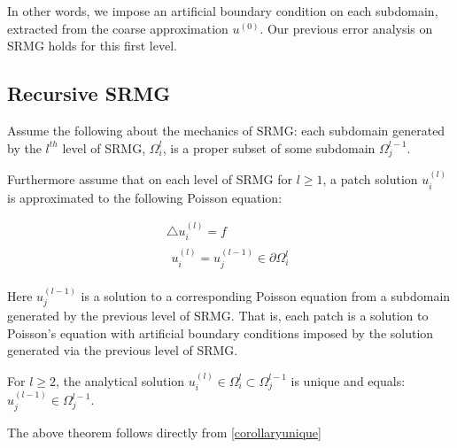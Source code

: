 \documentclass[final]{siamart1116}
\numberwithin{theorem}{section}
\begin{document}
In other words, we impose an artificial boundary condition on each subdomain, extracted from the coarse approximation $u^{(0)}$. Our previous error analysis on SRMG holds for this first level. 



\subsection{Recursive SRMG}

Assume the following about the mechanics of SRMG: each subdomain generated by the $l^{th}$ level of SRMG, $\Omega^{l}_i$, is a proper subset of some subdomain $\Omega^{l-1}_j$. 

Furthermore assume that on each level of SRMG for $l \geq 1$, a patch solution $u^{(l)}_i$ is approximated to the following Poisson equation:

\begin{gather}
  \bigtriangleup u^{(l)}_i = f \nonumber  \\
  \begin{split}
    u^{(l)}_i = u^{(l-1)}_j \in \partial \Omega^{l}_i \label{patchpdel}
  \end{split}
\end{gather}

Here $u^{(l-1)}_j$ is a solution to a corresponding Poisson equation from a subdomain generated by the previous level of SRMG. That is, each patch is a solution to Poisson's equation with artificial boundary conditions imposed by the solution generated via the previous level of SRMG.



\begin{theorem}
For $l \geq 2$, the analytical solution  $u^{(l)}_i \in  \Omega^{l}_i \subset \Omega^{l-1}_j $ is unique and equals:
$u^{(l-1)}_j \in \Omega^{l-1}_j $.  
\end{theorem}

The above theorem follows directly from \ref{corollaryunique}
 
\end{document}
